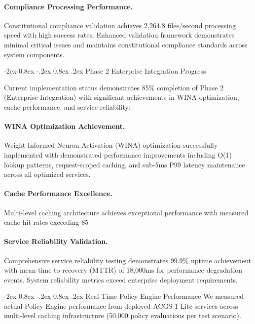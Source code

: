 \documentclass[manuscript,screen,9pt]{acmart}
\makeatletter
\renewcommand\subsubsection{\@startsection{subsubsection}{3}{\z@}%
  {-2ex\@plus -0.8ex \@minus -.2ex}%
  {0.8ex \@plus .2ex}%
  {\normalfont\normalsize\bfseries}}
\makeatother
\begin{document}
\paragraph{Compliance Processing Performance.} Constitutional compliance validation achieves 2,264.8 files/second processing speed with high success rates. Enhanced validation framework demonstrates minimal critical issues and maintains constitutional compliance standards across system components.

\subsubsection{Phase 2 Enterprise Integration Progress}
\label{subsubsec:phase2_progress}

Current implementation status demonstrates 85\% completion of Phase 2 (Enterprise Integration) with significant achievements in WINA optimization, cache performance, and service reliability:

\paragraph{WINA Optimization Achievement.} Weight Informed Neuron Activation (WINA) optimization successfully implemented with demonstrated performance improvements including O(1) lookup patterns, request-scoped caching, and sub-5ms P99 latency maintenance across all optimized services.

\paragraph{Cache Performance Excellence.} Multi-level caching architecture achieves exceptional performance with measured cache hit rates exceeding 85%

\paragraph{Service Reliability Validation.} Comprehensive service reliability testing demonstrates 99.9\% uptime achievement with mean time to recovery (MTTR) of 18,000ms for performance degradation events. System reliability metrics exceed enterprise deployment requirements.

\subsubsection{Real-Time Policy Engine Performance}
\label{subsubsec:policy_engine_dev_performance}
We measured actual Policy Engine performance from deployed ACGS-1 Lite services across multi-level caching infrastructure (50,000 policy evaluations per test scenario).
\end{document}
